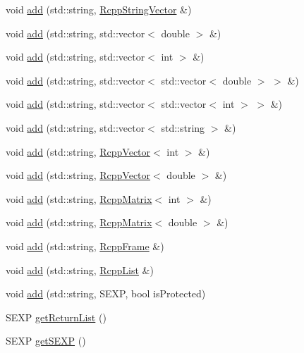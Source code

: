 \begin{DoxyCompactItemize}
void \hyperlink{classRcppResultSet_a10d01a24ef006c1ff14ca7e95fb9e0ea}{add} (std::string, \hyperlink{classRcppStringVector}{RcppStringVector} \&)
\item 
void \hyperlink{classRcppResultSet_a2b4575ca5ccc390bc5437b1be4718ca6}{add} (std::string, std::vector$<$ double $>$ \&)
\item 
void \hyperlink{classRcppResultSet_a23fa5be81281adcf3014749094816522}{add} (std::string, std::vector$<$ int $>$ \&)
\item 
void \hyperlink{classRcppResultSet_ab10cd8503c12708e27068b92a83e4047}{add} (std::string, std::vector$<$ std::vector$<$ double $>$ $>$ \&)
\item 
void \hyperlink{classRcppResultSet_ab51f30f4bd5f3c6153221a3bd7bb7e24}{add} (std::string, std::vector$<$ std::vector$<$ int $>$ $>$ \&)
\item 
void \hyperlink{classRcppResultSet_adb4236a049c8dceb7112229f5e68a295}{add} (std::string, std::vector$<$ std::string $>$ \&)
\item 
void \hyperlink{classRcppResultSet_a068cb13e27c0e26dd05e92d67eaeb7d0}{add} (std::string, \hyperlink{classRcppVector}{RcppVector}$<$ int $>$ \&)
\item 
void \hyperlink{classRcppResultSet_a10a64eb042cd3bac5b635670ae2fff5d}{add} (std::string, \hyperlink{classRcppVector}{RcppVector}$<$ double $>$ \&)
\item 
void \hyperlink{classRcppResultSet_a56f1bff720a6cf6503ab942bdb6892b3}{add} (std::string, \hyperlink{classRcppMatrix}{RcppMatrix}$<$ int $>$ \&)
\item 
void \hyperlink{classRcppResultSet_af6f50ca0a589fc12ef68c0406e83243b}{add} (std::string, \hyperlink{classRcppMatrix}{RcppMatrix}$<$ double $>$ \&)
\item 
void \hyperlink{classRcppResultSet_a9e05fb2ca92258529ffbb536e23a2a4d}{add} (std::string, \hyperlink{classRcppFrame}{RcppFrame} \&)
\item 
void \hyperlink{classRcppResultSet_a37b3d22adf1e47eec75ee664085daa59}{add} (std::string, \hyperlink{classRcppList}{RcppList} \&)
\item 
void \hyperlink{classRcppResultSet_a5f44a63a2cab43db551c0e27d6fec378}{add} (std::string, SEXP, bool isProtected)
\item 
SEXP \hyperlink{classRcppResultSet_a916989ff6c0ed1149a5f93fb6a532946}{getReturnList} ()
\item 
SEXP \hyperlink{classRcppResultSet_a372bdf017661811062631e0c9f1f5083}{getSEXP} ()
\end{DoxyCompactItemize}
